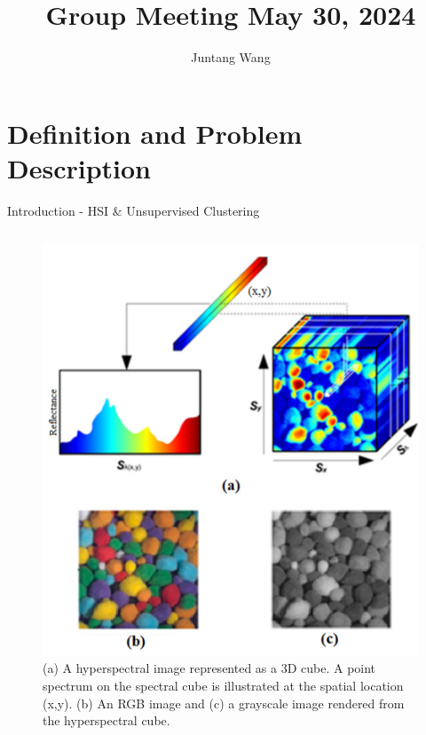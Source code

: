 \documentclass[10pt,svgnames,fragile]{beamer}
\subtitle{}
\institute[]{SOTA Report: \newline Hyperspectral Image Analysis for  Cluster Detection}
\author{Juntang Wang}
\date{}
\title{Group Meeting May 30, 2024}
\begin{document}
\maketitle

\section{Definition and Problem Description}
\begin{frame}{Introduction - HSI \& Unsupervised Clustering}
    \begin{columns}
        \begin{column}{0.38\textwidth}
            \begin{figure}
            \centering
            \includegraphics[width=1\linewidth]{HSI_example.png}
            \caption{(a) A hyperspectral image represented as a 3D cube. A point spectrum on the spectral cube is illustrated at the spatial location (x,y). (b) An RGB image and (c) a grayscale image rendered from the hyperspectral cube.\cite{khanModernTrendsHyperspectral2018}}
            \label{fig:khan-modern}
            \end{figure}
        \end{column}


\end{columns}
\end{frame}
\end{document}
